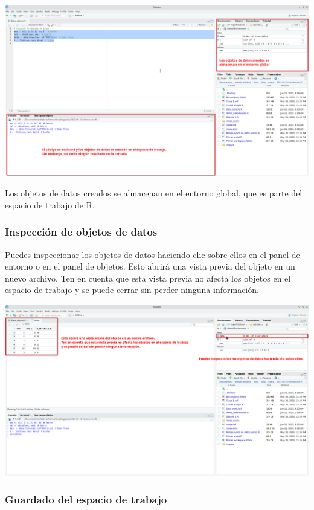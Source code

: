 \documentclass[
  letterpaper,
  DIV=11,
  numbers=noendperiod]{scrartcl}
\begin{document}
\includegraphics{images/Screenshot_20230611_094001.png}

Los objetos de datos creados se almacenan en el entorno global, que es
parte del espacio de trabajo de R.

\hypertarget{inspecciuxf3n-de-objetos-de-datos}{%
\subsubsection{Inspección de objetos de
datos}\label{inspecciuxf3n-de-objetos-de-datos}}

Puedes inspeccionar los objetos de datos haciendo clic sobre ellos en el
panel de entorno o en el panel de objetos. Esto abrirá una vista previa
del objeto en un nuevo archivo. Ten en cuenta que esta vista previa no
afecta los objetos en el espacio de trabajo y se puede cerrar sin perder
ninguna información.

\includegraphics{images/Screenshot_20230611_094530.png}

\hypertarget{guardado-del-espacio-de-trabajo}{%
\subsubsection{Guardado del espacio de
trabajo}\label{guardado-del-espacio-de-trabajo}}
\end{document}
